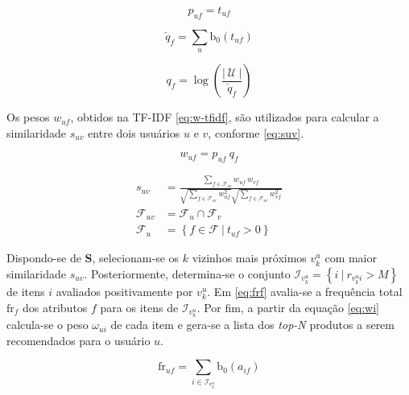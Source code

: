 \begin{equation}
\label{eq:tf} 
    p_{uf} = t_{uf}
\end{equation} 


\begin{equation}
\label{eq:uf} 
    \check{q}_{f} = \sum_{u}{\mathrm{b}_0\left(t_{uf}\right)}
\end{equation} 

\begin{equation}
\label{eq:iuf} 
    q_{f} = \log \left( \frac{\left|~\mathcal{U}~\right|}{\check{q}_{f}} \right)
\end{equation} 

Os pesos $w_{uf}$, obtidos na TF-IDF \ref{eq:w-tfidf}, são utilizados para calcular a similaridade $s_{uv}$ entre dois usuários $u$ e $v$, conforme \ref{eq:suv}.

\begin{equation}
\label{eq:w-tfidf} 
    w_{uf} = p_{uf}~q_{f}
\end{equation} 


\begin{equation}
\label{eq:suv}
\begin{split}
    s_{uv} &= \frac{\sum\limits_{f \in \mathcal{F}_{uv}}{w_{uf}~w_{vf}}}{\sqrt{\sum\limits_{f \in \mathcal{F}_{uv}
    }w_{uf}^2} \sqrt{\sum\limits_{f \in \mathcal{F}_{uv}}w_{vf}^2}} \\
    \mathcal{F}_{uv} &= \mathcal{F}_u \cap \mathcal{F}_v \\
    \mathcal{F}_u &= \left\{ f \in \mathcal{F}~|~t_{uf} > 0 \right\}
\end{split}    
\end{equation} 

Dispondo-se de $\mathbf{S}$, selecionam-se os $k$ vizinhos mais próximos $v_k^u$ com maior similaridade $s_{uv}$.  Posteriormente, determina-se o conjunto $\mathcal{I}_{v_k^u} = \left\{ i ~|~ r_{v_k^ui} > M\right\}$ de itens $i$ avaliados positivamente por $v_k^u$. Em \ref{eq:frf} avalia-se a frequência total $\mathrm{fr}_f$ dos atributos $f$ para os itens de $\mathcal{I}_{v_k^u}$. Por fim, a partir da equação \ref{eq:wi} calcula-se o peso $\omega_{ui}$ de cada item e gera-se a lista dos \textit{top-N} produtos a serem recomendados para o usuário $u$. 


\begin{equation}
\label{eq:frf} 
\mathrm{fr}_{uf} = \sum_{i \in \mathcal{I}_{v_k^u}}{\mathrm{b}_0\left(a_{if}\right)}
\end{equation} 

